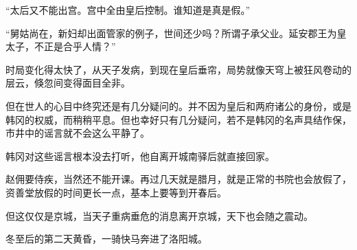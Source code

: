 “太后又不能出宫。宫中全由皇后控制。谁知道是真是假。” 

“舅姑尚在，新妇却出面管家的例子，世间还少吗？所谓子承父业。延安郡王为皇太子，不正是合乎人情？” 

时局变化得太快了，从天子发病，到现在皇后垂帘，局势就像天穹上被狂风卷动的层云，倏忽间变得面目全非。 

但在世人的心目中终究还是有几分疑问的。并不因为皇后和两府诸公的身份，或是韩冈的权威，而稍稍平息。但也幸好只有几分疑问，若不是韩冈的名声具结作保，市井中的谣言就不会这么平静了。 

韩冈对这些谣言根本没去打听，他自离开城南驿后就直接回家。 

赵佣要侍疾，当然还不能开课。再过几天就是腊月，就是正常的书院也会放假了，资善堂放假的时间更长一点，基本上要等到开春后。 

但这仅仅是京城，当天子重病垂危的消息离开京城，天下也会随之震动。 

冬至后的第二天黄昏，一骑快马奔进了洛阳城。 

